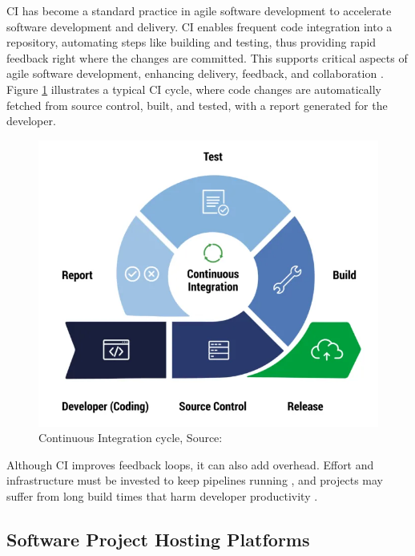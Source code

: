 \acf{CI} has become a standard practice in agile software development to accelerate software development and delivery. CI enables frequent code integration into a repository, automating steps like building and testing, thus providing rapid feedback right where the changes are committed. This supports critical aspects of agile software development, enhancing delivery, feedback, and collaboration \cite{ugwuezeContinuousIntegrationDeployment2024}. Figure \ref{fig:ci-cycle} illustrates a typical CI cycle, where code changes are automatically fetched from source control, built, and tested, with a report generated for the developer.

\begin{figure}[H]
    \centering
    \includegraphics[width=1\textwidth]{images/ci-cycle.png}
    \caption{Continuous Integration cycle, Source:~\cite{lovettTop12Benefits2023}}
    \label{fig:ci-cycle}
\end{figure}

Although \ac{CI} improves feedback loops, it can also add overhead. Effort and infrastructure must be invested to keep pipelines running \cite{hiltonUsageCostsBenefits2016}, and projects may suffer from long build times that harm developer productivity \cite{ghalebEmpiricalStudyLong2019}.

\subsection{Software Project Hosting Platforms} \label{subsection:Software Project Hosting Platforms}

